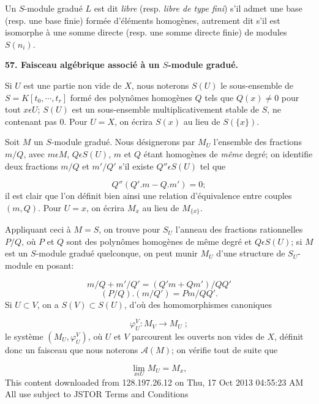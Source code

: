 Un $S$-module gradué $L$ est dit \textit{libre} (resp. \textit{libre de type fini}) s'il admet une base (resp. une base finie) formée d'éléments homogènes, autrement dit s'il est isomorphe à une somme directe (resp. une somme directe finie) de modules $S(n_i)$.


\textbf{57. Faisceau algébrique associé à un $S$-module gradué.}

Si $U$ est une partie non vide de $X$, nous noterons $S(U)$ le sous-ensemble de $S = K[t_0 , \cdots , t_r]$ formé des polynômes homogènes $Q$ tels que $Q(x) \neq 0$ pour tout $x \epsilon U$; $S(U)$ est un sous-ensemble multiplicativement stable de $S$, ne contenant pas 0. Pour $U = X$, on écrira $S(x)$ au lieu de $S(\{x\})$.

Soit $M$ un $S$-module gradué. Nous désignerons par $M_U$ l'ensemble des fractions $m/Q$, avec $m \epsilon M$, $Q \epsilon S(U)$, $m$ et $Q$ étant homogènes de \textit{même} degré; on identifie deux fractions $m/Q$ et $m'/Q'$ s'il existe $Q'' \epsilon S(U)$ tel que

\begin{equation*}
Q''(Q'.m - Q.m') = 0;
\end{equation*}
il est clair que l'on définit bien ainsi une relation d'équivalence entre couples $(m, Q)$. Pour $U = x$, on écrira $M_x$ au lieu de $M_{\{x\}}$.

Appliquant ceci à $M = S$, on trouve pour $S_U$ l'anneau des fractions rationnelles $P/Q$, où $P$ et $Q$ sont des polynômes homogènes de même degré et $Q \epsilon S(U)$; si $M$ est un $S$-module gradué quelconque, on peut munir $M_U$ d'une structure de $S_U$-module en posant:

\begin{equation*}
m/Q + m'/Q' = (Q'm + Qm')/QQ'
\end{equation*}
\begin{equation*}
(P/Q).(m/Q') = Pm/QQ'.
\end{equation*}
Si $U \subset V$, on a $S(V) \subset S(U)$, d'où des homomorphismes canoniques

\begin{equation*}
\varphi_U^V : M_V \to M_U \; ;
\end{equation*}
le système $(M_U , \varphi_U^V)$, où $U$ et $V$ parcourent les ouverts non vides de $X$, définit donc un faisceau que nous noterons $\mathcal{A}(M)$; on vérifie tout de suite que

\begin{equation*}
\lim_{x \epsilon U} M_U = M_x , 
\end{equation*}
This content downloaded from 128.197.26.12 on Thu, 17 Oct 2013 04:55:23 AM\\All use subject to JSTOR Terms and Conditions


